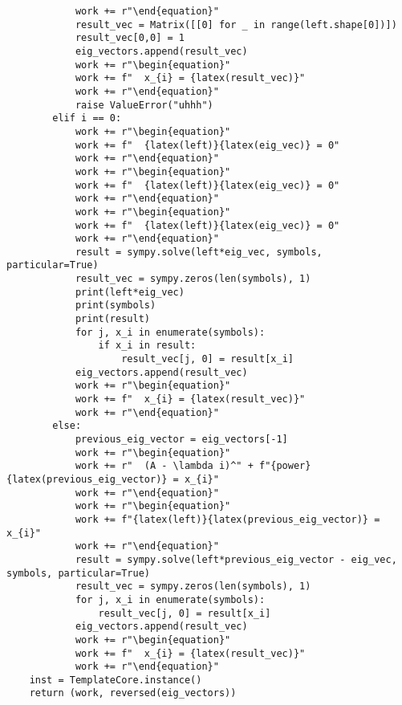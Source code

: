 \begin{verbatim}
            work += r"\end{equation}"
            result_vec = Matrix([[0] for _ in range(left.shape[0])])
            result_vec[0,0] = 1
            eig_vectors.append(result_vec)
            work += r"\begin{equation}"
            work += f"  x_{i} = {latex(result_vec)}"
            work += r"\end{equation}"
            raise ValueError("uhhh")
        elif i == 0:
            work += r"\begin{equation}"
            work += f"  {latex(left)}{latex(eig_vec)} = 0"
            work += r"\end{equation}"
            work += r"\begin{equation}"
            work += f"  {latex(left)}{latex(eig_vec)} = 0"
            work += r"\end{equation}"
            work += r"\begin{equation}"
            work += f"  {latex(left)}{latex(eig_vec)} = 0"
            work += r"\end{equation}"
            result = sympy.solve(left*eig_vec, symbols, particular=True)
            result_vec = sympy.zeros(len(symbols), 1)
            print(left*eig_vec)
            print(symbols)
            print(result)
            for j, x_i in enumerate(symbols):
                if x_i in result:
                    result_vec[j, 0] = result[x_i]
            eig_vectors.append(result_vec)
            work += r"\begin{equation}"
            work += f"  x_{i} = {latex(result_vec)}"
            work += r"\end{equation}"
        else:
            previous_eig_vector = eig_vectors[-1]
            work += r"\begin{equation}"
            work += r"  (A - \lambda i)^" + f"{power}{latex(previous_eig_vector)} = x_{i}"
            work += r"\end{equation}"
            work += r"\begin{equation}"
            work += f"{latex(left)}{latex(previous_eig_vector)} = x_{i}"
            work += r"\end{equation}"
            result = sympy.solve(left*previous_eig_vector - eig_vec, symbols, particular=True)
            result_vec = sympy.zeros(len(symbols), 1)
            for j, x_i in enumerate(symbols):
                result_vec[j, 0] = result[x_i]
            eig_vectors.append(result_vec)
            work += r"\begin{equation}"
            work += f"  x_{i} = {latex(result_vec)}"
            work += r"\end{equation}"
    inst = TemplateCore.instance()
    return (work, reversed(eig_vectors))
    

\end{verbatim}
